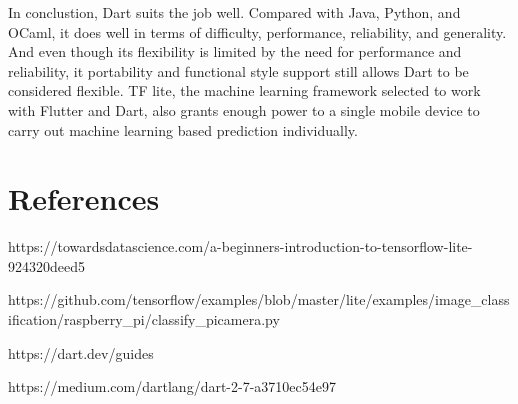 \documentclass[letterpaper,twocolumn,10pt]{article}
\begin{document}
In conclustion, Dart suits the job well.
Compared with Java, Python, and OCaml, it does well in terms of difficulty, performance, reliability, and generality.
And even though its flexibility is limited by the need for performance and reliability, it portability and functional style support still allows Dart to be considered flexible.
TF lite, the machine learning framework selected to work with Flutter and Dart, also grants enough power to a single mobile device to carry out machine learning based prediction individually.

\newpage
\section{References}

https://towardsdatascience.com/a-beginners-introduction-to-tensorflow-lite-924320deed5

https://github.com/tensorflow/examples/blob/master/lite/examples/image\_classification/raspberry\_pi/classify\_picamera.py

https://dart.dev/guides

https://medium.com/dartlang/dart-2-7-a3710ec54e97


% 

\end{document}
